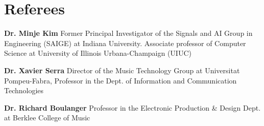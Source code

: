 \section{Referees}
\resumeSubHeadingListStart
\item{\textbf{Dr. Minje Kim}  
\newline Former Principal Investigator of the Signals and AI Group in Engineering (SAIGE) at Indiana University. Associate professor of Computer Science at University of Illinois Urbana-Champaign (UIUC)}

\item{\textbf{Dr. Xavier Serra}  
\newline Director of the Music Technology Group at Universitat Pompeu-Fabra, Professor in the Dept. of Information and Communication Technologies}

\item{\textbf{Dr. Richard Boulanger}  
\newline Professor in the Electronic Production \& Design Dept. at Berklee College of Music}
\resumeSubHeadingListEnd